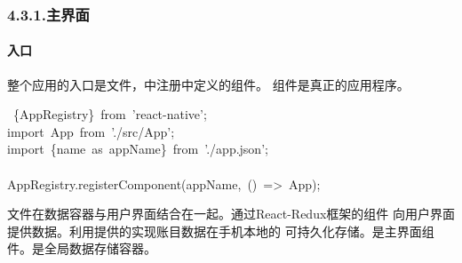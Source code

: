\documentclass{article}
\begin{document}
\subsubsection{4.3.1.\hspace*{0.5em}主界面}\label{section}%

\paragraph{入口}\label{section}%

\noindent{}整个应用的入口是文件，中注册中定义的组件。
组件是真正的应用程序。%
\begin{mdpre}%
~\{AppRegistry\}~{from}~{'}{react-native}{'};\\
{import}~App~{from}~{'}{./src/App}{'};\\
{import}~\{name~{as}~appName\}~{from}~{'}{./app.json}{'};\\
\\
AppRegistry.registerComponent(appName,~()~=\textgreater{}~App);%
\end{mdpre}\noindent{}文件在数据容器与用户界面结合在一起。通过React-Redux框架的组件
向用户界面提供数据。利用提供的实现账目数据在手机本地的
可持久化存储。是主界面组件。是全局数据存储容器。
\end{document}

